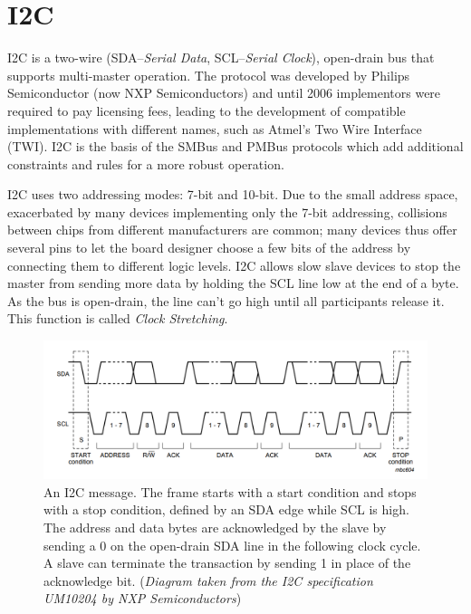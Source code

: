 
\section{I2C}

I2C is a two-wire (SDA--\textit{Serial Data}, SCL--\textit{Serial Clock}), open-drain bus that supports multi-master operation. The protocol was developed by Philips Semiconductor (now NXP Semiconductors) and until 2006 implementors were required to pay licensing fees, leading to the development of compatible implementations with different names, such as Atmel's Two Wire Interface (TWI). I2C is the basis of the SMBus and PMBus protocols which add additional constraints and rules for a more robust operation.

I2C uses two addressing modes: 7-bit and 10-bit. Due to the small address space, exacerbated by many devices implementing only the 7-bit addressing, collisions between chips from different manufacturers are common; many devices thus offer several pins to let the board designer choose a few bits of the address by connecting them to different logic levels. I2C allows slow slave devices to stop the master from sending more data by holding the SCL line low at the end of a byte. As the bus is open-drain, the line can't go high until all participants release it. This function is called \textit{Clock Stretching}.

\begin{figure}
	\centering
	\includegraphics[width=.9\textwidth] {img/i2c-frame.png}
	\caption{\label{fig:i2c-frame}An I2C message. The frame starts with a start condition and stops with a stop condition, defined by an SDA edge while SCL is high. The address and data bytes are acknowledged by the slave by sending a 0 on the open-drain SDA line in the following clock cycle. A slave can terminate the transaction by sending 1 in place of the acknowledge bit. (\textit{Diagram taken from the I2C specification UM10204 by NXP Semiconductors})}
\end{figure}


